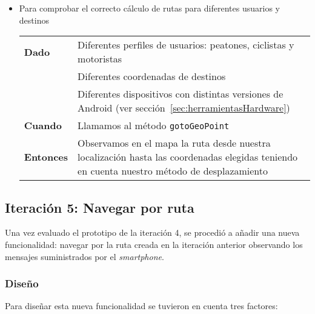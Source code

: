 \begin{itemize}
  \item Para comprobar el correcto cálculo de rutas para diferentes usuarios y destinos

  \begin{tabular}{p{}p{}}
    \hline
    \textbf{Dado}     & Diferentes perfiles de usuarios: peatones, ciclistas y motoristas \\
                      & Diferentes coordenadas de destinos \\
                      & Diferentes dispositivos con distintas versiones de Android (ver
                        sección~\ref{sec:herramientasHardware}) \\
    \textbf{Cuando}   & Llamamos al método \texttt{gotoGeoPoint} \\
    \textbf{Entonces} & Observamos en el mapa la ruta desde nuestra localización hasta las
                        coordenadas elegidas teniendo en cuenta nuestro método de desplazamiento \\
    \hline
  \end{tabular}
\end{itemize}

\subsection{Iteración 5: Navegar por ruta}
\label{sec:ite5}

Una vez evaluado el prototipo de la iteración 4, se procedió a añadir una nueva funcionalidad:
navegar por la ruta creada en la iteración anterior observando los mensajes suministrados por el
\emph{smartphone}.

\subsubsection{Diseño}

Para diseñar esta nueva funcionalidad se tuvieron en cuenta tres factores:


